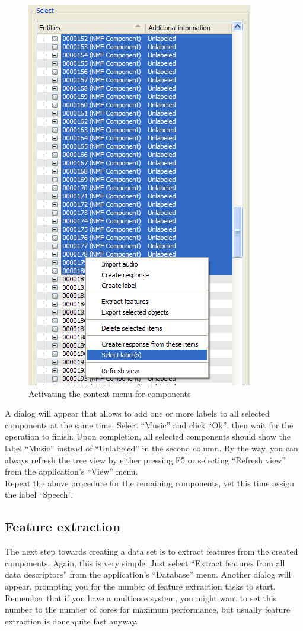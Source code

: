 \begin{figure}
    \centering
    \includegraphics[width=.6\textwidth]{tutorial-media/SelectLabels.png}
    \caption{%
        \label{figure:TutorialSelectLabels}%
        Activating the context menu for components
    }
\end{figure}

A dialog will appear that allows to add one or more labels to all selected
components at the same time. Select ``Music'' and click ``Ok'', then wait for
the operation to finish. Upon completion, all selected components should show
the label ``Music'' instead of ``Unlabeled'' in the second column. By the way,
you can always refresh the tree view by either pressing F5 or selecting
``Refresh view'' from the application's ``View'' menu.\\

Repeat the above procedure for the remaining components, yet this time assign
the label ``Speech''.


\subsection{Feature extraction}

The next step towards creating a data set is to extract features from the
created components. Again, this is very simple: Just select ``Extract features
from all data descriptors'' from the application's ``Database'' menu. Another
dialog will appear, prompting you for the number of feature extraction tasks to
start.  Remember that if you have a multicore system, you might want to set this
number to the number of cores for maximum performance, but usually feature
extraction is done quite fast anyway.\\

